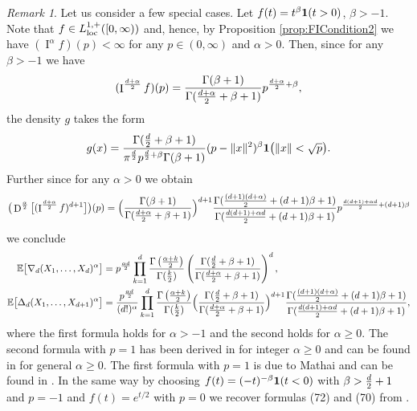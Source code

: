 \documentclass[11pt,a4paper]{article}
\theoremstyle{plain}
\theoremstyle{definition}
\theoremstyle{remark}
\newtheorem{remark}[theorem]{Remark}
\def\EE{\mathbb{E}}
\newcommand{\frI}{\mathop{\mathrm{I}}\nolimits}
\newcommand{\frD}{\mathop{\mathrm{D}}\nolimits}
\begin{document}
\begin{remark}
    Let us consider a few special cases. Let $f(t)=t^{\beta}{\bf 1}(t>0)$, $\beta>-1$. Note that $f\in L_{\rm loc}^{1,+}([0,\infty))$ and, hence, by Proposition \ref{prop:FICondition2} we have $(\frI^{\alpha}f)(p)<\infty$ for any $p\in(0,\infty)$ and $\alpha>0$. Then, since for any $\beta>-1$ we have
    \begin{equation}\label{eq:30.05.24_1}
        (\frI^{d+\alpha\over 2}f)(p)={\Gamma(\beta+1)\over \Gamma({d+\alpha\over 2}+\beta+1)}p^{{d+\alpha\over 2}+\beta},
    \end{equation}
    the density $g$ takes the form
    $$
        g(x)={\Gamma({d\over 2}+\beta+1)\over \pi^{d\over 2}p^{{d\over 2}+\beta}\Gamma(\beta+1)}(p-\|x\|^2)^{\beta}{\bf 1}\big(\|x\|<\sqrt{p}\big).
    $$
    Further since for any $\alpha>0$ we obtain
    \begin{equation}\label{eq:30.05.24_2}
        \big(\frD^{\frac{\alpha}{2}}\big[(\frI^{\frac{d+\alpha}{2}}f)^{d+1}\big]\big)(p)=\Big({\Gamma(\beta+1)\over \Gamma({d+\alpha\over 2}+\beta+1)}\Big)^{d+1}{\Gamma({(d+1)(d+\alpha)\over 2}+(d+1)\beta+1)\over \Gamma({d(d+1)+\alpha d\over 2}+(d+1)\beta+1)}p^{{d(d+1)+\alpha d\over 2}+(d+1)\beta}
    \end{equation}
    we conclude
    \begin{align*}
        \EE \big[\nabla_d(X_1,\ldots,X_{d})^{\alpha}\big]&=p^{\alpha d\over 2}\prod_{k=1}^{d}\frac{\Gamma\left(\frac{\alpha+k}{2}\right)}{\Gamma(\frac{k}{2})} \left({\Gamma({d\over 2}+\beta+1)\over \Gamma({d+\alpha\over 2}+\beta+1)}\right)^d,\\
        \EE \big[\Delta_d(X_1,\ldots,X_{d+1})^{\alpha}\big]&=\frac{p^{\alpha d\over 2}}{(d!)^\alpha} \prod_{k=1}^{d}\frac{\Gamma\left(\frac{\alpha+k}{2}\right)}{\Gamma(\frac{k}{2})}\Big({\Gamma({d\over 2}+\beta+1)\over \Gamma({d+\alpha\over 2}+\beta+1)}\Big)^{d+1}{\Gamma({(d+1)(d+\alpha)\over 2}+(d+1)\beta+1)\over \Gamma({d(d+1)+\alpha d\over 2}+(d+1)\beta+1)},
    \end{align*}
    where the first formula holds for $\alpha>-1$ and the second holds for $\alpha\ge 0$. The second formula with $p=1$ has been derived in \cite[Equation (74)]{Miles_IRS} for integer $\alpha\ge 0$ and can be found in \cite[Proposition 2.8]{KTT} for general $\alpha\ge 0$. The first formula with $p=1$ is due to Mathai and can be found in \cite[Theorem 19.2.5]{charalambides2000probability}. In the same way by choosing $f(t)=(-t)^{-\beta}{\bf 1}(t<0)$ with $\beta>{d\over 2}+1$ and $p=-1$ and $f(t)=e^{t/2}$ with $p=0$ we recover formulas (72) and (70) from \cite{Miles_IRS}.
\end{remark}
\end{document}

